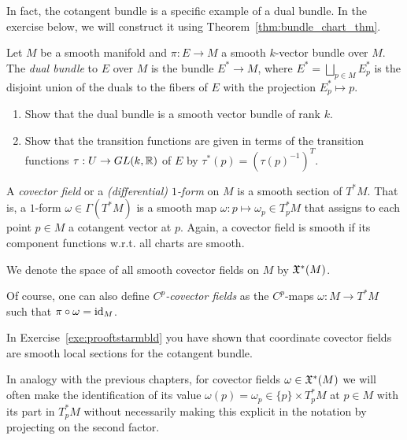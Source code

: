 In fact, the cotangent bundle is a specific example of a dual bundle.
In the exercise below, we will construct it using Theorem~\ref{thm:bundle_chart_thm}.
\begin{exercise}
	Let $M$ be a smooth manifold and $\pi:E\to M$ a smooth $k$-vector bundle over $M$.
	The \emph{dual bundle} to $E$ over $M$ is the bundle $E^* \to M$, where $E^* = \bigsqcup_{p\in M} E_p^*$ is the disjoint union of the duals to the fibers of $E$ with the projection $E_p^* \mapsto p$.
	\begin{enumerate}
		\item Show that the dual bundle is a smooth vector bundle of rank $k$.
		\item Show that the transition functions are given in terms of the transition functions $\tau : U\to GL(k,\mathbb{R})$ of $E$ by $\tau^*(p) = (\tau(p)^{-1})^T$.
	\end{enumerate}
\end{exercise}

\begin{definition}\label{def:covfield}
	A \emph{covector field} or a \emph{(differential) $1$-form} on $M$ is a smooth section of $T^*M$.
	That is, a $1$-form $\omega\in\Gamma(T^*M)$ is a smooth map $\omega: p \mapsto \omega_p \in T_p^*M$ that assigns to each point $p\in M$ a cotangent vector at $p$.
	Again, a covector field is smooth if its component functions w.r.t. all charts are smooth.

	We denote the space of all smooth covector fields on $M$ by $\mathfrak{X}^*(M)$.

	Of course, one can also define \emph{$C^p$-covector fields} as the $C^p$-maps $\omega:M\to T^*M$ such that $\pi\circ\omega = \operatorname{id}_M$.
\end{definition}

\begin{remark}
	In Exercise~\ref{exe:prooftstarmbld} you have shown that coordinate covector fields are smooth local sections for the cotangent bundle.
\end{remark}

In analogy with the previous chapters, for covector fields $\omega\in\mathfrak{X}^*(M)$ we will often make the identification of its value $\omega(p) = \omega_p \in \{p\}\times T^*_p M$ at $p\in M$ with its part in $T_p^*M$ without necessarily making this explicit in the notation by projecting on the second factor.

